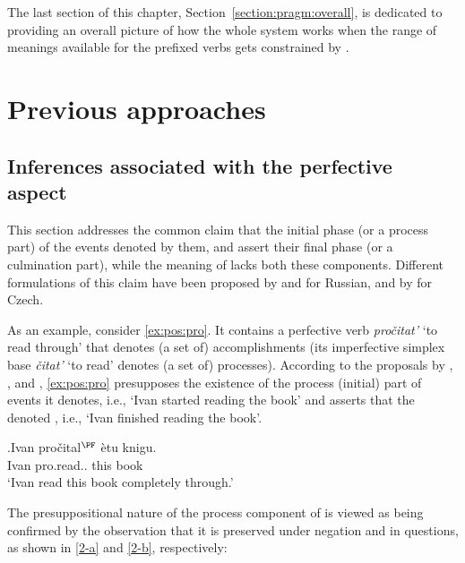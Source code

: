 The last section of this chapter, Section~\ref{section:pragm:overall}, is dedicated to providing an overall picture of how the whole  system works when the range of meanings available for the prefixed verbs gets constrained by . 

\section{Previous approaches}\label{sec:pragm:old}
\subsection{Inferences associated with the perfective aspect}\label{sec:pragm:old:perf}
This section addresses the common claim that   the initial phase (or a process part) of the events denoted by them, and assert their final phase (or a culmination part), while the meaning of  lacks both these components. Different formulations of this claim have been proposed by \citet{Paducheva:96, Paducheva:11} and \citet{Romanova:06} for Russian, and by \citet{Docekal:09} for Czech.

As an example, consider \ref{ex:pos:pro}. It contains a perfective verb \textit{pro\v{c}itat'} `to read through' that denotes (a set of) accomplishments (its imperfective simplex base \textit{\v{c}itat'} `to read' denotes (a set of) processes). According to the proposals by \citet{Paducheva:96, Paducheva:11}, \citet{Romanova:06}, and \citet{Docekal:09}, \ref{ex:pos:pro} presupposes the existence of the process (initial) part of events it denotes, i.e., `Ivan started reading the book' and asserts that the denoted , i.e., `Ivan finished reading the book'.

\exg.\label{ex:pos:pro}Ivan pro\v{c}ital$^{\PF}$ \`{e}tu knigu.\\
Ivan pro.read.. this book\\
\trans `Ivan read this book completely through.'

The presuppositional nature of the process component of  is viewed as being confirmed by the observation that it is preserved under negation and in questions, as shown in \ref{2-a} and \ref{2-b}, respectively: 

